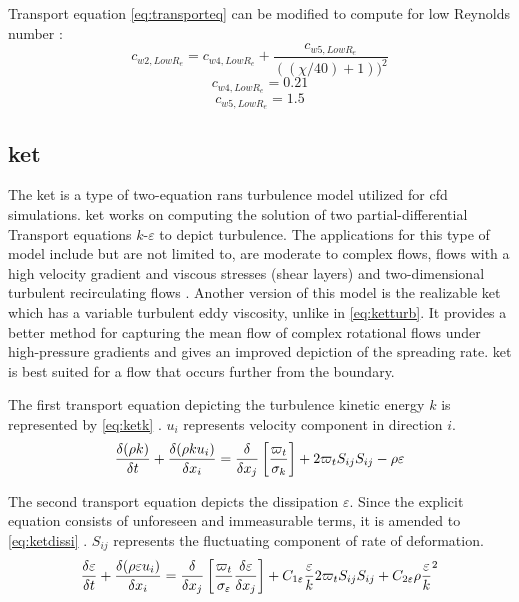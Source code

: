 \documentclass[english]{kththesis}
\begin{document}
Transport equation \ref{eq:transporteq} can be modified to compute for low Reynolds number \cite{LangleyResearchCenter2015}:
\begin{equation}{c_{w2,Low{R_e}}} = {c_{w4,Low{R_e}}} + \frac{{{c_{w5,Low{R_e}}}}}{{((\chi /40) + 1){)^2}}}\end{equation}
\begin{equation}{c_{w4,Low{R_e}}} = 0.21\end{equation}
\begin{equation}{c_{w5,Low{R_e}}} = 1.5\end{equation}

\subsection{\acrfull{ket}}
The \acrfull{ket} is a type of two-equation \acrfull{rans} turbulence model utilized for \acrshort{cfd} simulations. \acrshort{ket} works on computing the solution of two partial-differential Transport equations $k$-$\varepsilon$ to depict turbulence. The applications for this type of model include but are not limited to, are moderate to complex flows, flows with a high velocity gradient and viscous stresses (shear layers) and two-dimensional turbulent recirculating flows \cite{Zhang1994}.  Another version of this model is the realizable \acrshort{ket} which has a variable turbulent eddy viscosity, unlike in \ref{eq:ketturb}. It provides a better method for capturing the mean flow of complex rotational flows under high-pressure gradients and gives an improved depiction of the spreading rate. \acrshort{ket} is best suited for a flow that occurs further from the boundary.

The first transport equation depicting the turbulence kinetic energy $k$ is represented by \ref{eq:ketk} \cite{Launder1974}. ${u_i}$ represents velocity component in direction $i$.
\begin{equation}
\label{eq:ketk}
{{\delta (\rho k)} \over {\delta t}} + {{\delta (\rho k{u_i})} \over {\delta {x_i}}} = {\delta  \over {\delta {x_j}}}\left[ {{{{\varpi _t}} \over {{\sigma _k}}}} \right] + 2{\varpi_t}{S_{ij}}{S_{ij}} - \rho \varepsilon 
\end{equation}

The second transport equation depicts the dissipation $\varepsilon$. Since the explicit equation consists of unforeseen and immeasurable terms, it is amended to \ref{eq:ketdissi} \cite{Launder1974}. ${S_{ij}}$ represents the fluctuating component of rate of deformation.
\begin{equation}
\label{eq:ketdissi}
{{\delta \varepsilon } \over {\delta t}} + {{\delta (\rho \varepsilon {u_i})} \over {\delta {x_i}}} = {\delta  \over {\delta {x_j}}}\left[ {{{{\varpi_t}} \over {{\sigma _\varepsilon }}}{{\delta \varepsilon } \over {\delta {x_j}}}} \right] + {C_{1\varepsilon }}{\varepsilon  \over k}2{\varpi _t}{S_{ij}}{S_{ij}} + {C_{2\varepsilon }}\rho {{\varepsilon  \over k}^2}
\end{equation}
\end{document}
